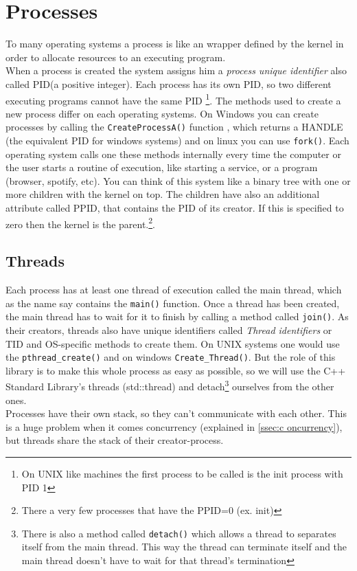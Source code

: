 \section{Processes}
To many operating systems a process is like an wrapper defined by the kernel in order to allocate resources to an executing program.\\
When a process is created the system assigns him a \textit{process unique identifier} also called PID(a positive integer). Each process has its own PID, so two different executing programs cannot have the same PID \footnote{On UNIX like machines the first process to be called is the init process with PID 1}. The methods used to create a new process differ on each operating systems.
On Windows you can create processes by calling the \texttt{CreateProcessA()} function \cite{createProcWinAPI}, which returns a HANDLE (the equivalent PID for windows systems) and on linux you can use \texttt{fork()}\cite{LPI}. Each operating system calls one these methods internally every time the computer or the user starts a routine of execution, like starting a service, or a program (browser, spotify, etc). You can think of this system like a binary tree with one or more children with the kernel on top. The children have also an additional attribute called PPID, that contains the PID of its creator. If this is specified to zero then the kernel is the parent.\cite{wikiPPID}\footnote{There a very few processes that have the PPID=0 (ex. init)}.
\subsection{Threads} 
Each process has at least one thread of execution called the main thread, which as the name say contains the \texttt{main()} function. Once a thread has been created, the main thread has to wait for it to finish by calling a method called \texttt{join()}. As their creators, threads also have unique identifiers called \textit{Thread identifiers} or TID and OS-specific methods to create them. On UNIX systems one would use the \texttt{pthread\_create()} and on windows \texttt{Create\_Thread()}. But the role of this library is to make this whole process as easy as possible, so we will use the C++ Standard Library's threads (std::thread) and \dq detach\dq{}\footnote{There is also a method called \texttt{detach()} which allows a thread to separates itself from the main thread. This way the thread can terminate itself and the main thread doesn't have to wait for that thread's termination} ourselves from the other ones.\\
Processes have their own stack, so they can't communicate with each other. This is a huge problem when it comes concurrency (explained in \autoref{ssec:c	oncurrency}), but threads share the stack of their creator-process.
